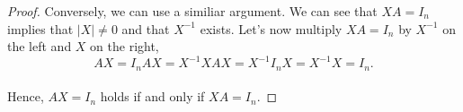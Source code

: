 \documentclass[ 12pt ]{article}
\begin{document}
\begin{enumerate}
\begin{proof}
		Conversely, we can use a similiar argument. We can see that $XA = I_n$ implies that $|X| \neq 0$ and that $X^{-1}$ exists. Let's now multiply $XA = I_n$ by $X^{-1}$
		on the left and $X$ on the right, $$AX = I_nAX = X^{-1}XAX = X^{-1}I_nX = X^{-1}X = I_n.$$ \\

		Hence, $AX = I_n$ holds if and only if $XA = I_n$.
	\end{proof}
\end{enumerate}
\end{document}

